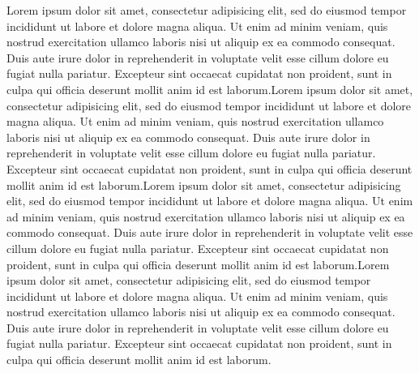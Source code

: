 Lorem ipsum dolor sit amet, consectetur adipisicing elit, sed do eiusmod tempor incididunt ut labore et dolore magna aliqua. Ut enim ad minim veniam, quis nostrud exercitation ullamco laboris nisi ut aliquip ex ea commodo consequat. Duis aute irure dolor in reprehenderit in voluptate velit esse cillum dolore eu fugiat nulla pariatur. Excepteur sint occaecat cupidatat non proident, sunt in culpa qui officia deserunt mollit anim id est laborum.Lorem ipsum dolor sit amet, consectetur adipisicing elit, sed do eiusmod tempor incididunt ut labore et dolore magna aliqua. Ut enim ad minim veniam, quis nostrud exercitation ullamco laboris nisi ut aliquip ex ea commodo consequat. Duis aute irure dolor in reprehenderit in voluptate velit esse cillum dolore eu fugiat nulla pariatur. Excepteur sint occaecat cupidatat non proident, sunt in culpa qui officia deserunt mollit anim id est laborum.Lorem ipsum dolor sit amet, consectetur adipisicing elit, sed do eiusmod tempor incididunt ut labore et dolore magna aliqua. Ut enim ad minim veniam, quis nostrud exercitation ullamco laboris nisi ut aliquip ex ea commodo consequat. Duis aute irure dolor in reprehenderit in voluptate velit esse cillum dolore eu fugiat nulla pariatur. Excepteur sint occaecat cupidatat non proident, sunt in culpa qui officia deserunt mollit anim id est laborum.Lorem ipsum dolor sit amet, consectetur adipisicing elit, sed do eiusmod tempor incididunt ut labore et dolore magna aliqua. Ut enim ad minim veniam, quis nostrud exercitation ullamco laboris nisi ut aliquip ex ea commodo consequat. Duis aute irure dolor in reprehenderit in voluptate velit esse cillum dolore eu fugiat nulla pariatur. Excepteur sint occaecat cupidatat non proident, sunt in culpa qui officia deserunt mollit anim id est laborum.


